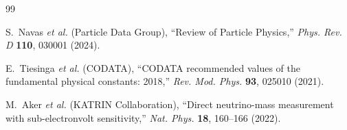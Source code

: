 \documentclass[12pt,a4paper]{article}
\begin{document}
	\begin{thebibliography}{99}
		
		S.~Navas \textit{et al.} (Particle Data Group), ``Review of Particle Physics,'' \textit{Phys. Rev. D} \textbf{110}, 030001 (2024).
		
		E.~Tiesinga \textit{et al.} (CODATA), ``CODATA recommended values of the fundamental physical constants: 2018,'' \textit{Rev. Mod. Phys.} \textbf{93}, 025010 (2021).
		
		M.~Aker \textit{et al.} (KATRIN Collaboration), ``Direct neutrino-mass measurement with sub-electronvolt sensitivity,'' \textit{Nat. Phys.} \textbf{18}, 160--166 (2022).
		
	\end{thebibliography}
	
\end{document}
